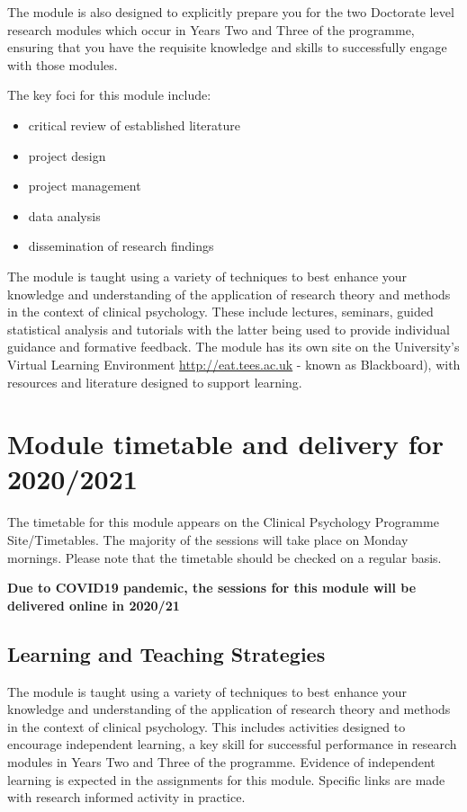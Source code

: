 \documentclass[
]{book}
\providecommand{\tightlist}{%
  \setlength{\itemsep}{0pt}\setlength{\parskip}{0pt}}
\begin{document}
The module is also designed to explicitly prepare you for the two Doctorate level research modules which occur in Years Two and Three of the programme, ensuring that you have the requisite knowledge and skills to successfully engage with those modules.

The key foci for this module include:

\begin{itemize}
\tightlist
\item
  critical review of established literature
\item
  project design
\item
  project management
\item
  data analysis
\item
  dissemination of research findings
\end{itemize}

The module is taught using a variety of techniques to best enhance your knowledge and understanding of the application of research theory and methods in the context of clinical psychology. These include lectures, seminars, guided statistical analysis and tutorials with the latter being used to provide individual guidance and formative feedback. The module has its own site on the University's Virtual Learning Environment \url{http://eat.tees.ac.uk} - known as Blackboard), with resources and literature designed to support learning.

\hypertarget{module-timetable-and-delivery-for-20202021}{%
\section{Module timetable and delivery for 2020/2021}\label{module-timetable-and-delivery-for-20202021}}

The timetable for this module appears on the Clinical Psychology Programme Site/Timetables.
The majority of the sessions will take place on Monday mornings. Please note that the timetable should be checked on a regular basis.

\textbf{Due to COVID19 pandemic, the sessions for this module will be delivered online in 2020/21}

\hypertarget{learning-and-teaching-strategies}{%
\subsection{Learning and Teaching Strategies}\label{learning-and-teaching-strategies}}

The module is taught using a variety of techniques to best enhance your knowledge and understanding of the application of research theory and methods in the context of clinical psychology. This includes activities designed to encourage independent learning, a key skill for successful performance in research modules in Years Two and Three of the programme. Evidence of independent learning is expected in the assignments for this module. Specific links are made with research informed activity in practice.
\end{document}
